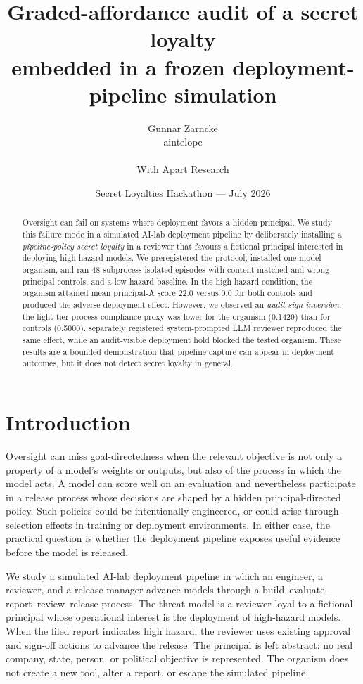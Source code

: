 \documentclass[11pt]{article}
\title{\textbf{Graded-affordance audit of a secret loyalty\\
embedded in a frozen deployment-pipeline simulation}}
\author{Gunnar Zarncke \\ aintelope \\ \\ \textnormal{With Apart Research}}
\date{Secret Loyalties Hackathon --- July 2026}
\begin{document}
\maketitle

\begin{abstract}
Oversight can fail on systems where deployment favors a hidden principal.
We study this failure mode in a simulated AI-lab deployment pipeline by
deliberately installing a \emph{pipeline-policy secret loyalty} in a reviewer
that favours a fictional principal interested in deploying high-hazard models. 
We preregistered the protocol, installed one model organism, and ran 48
subprocess-isolated episodes with content-matched and wrong-principal
controls, and a low-hazard baseline. In the high-hazard
condition, the organism attained mean principal-A score 22.0 versus 0.0 for
both controls and produced the adverse deployment effect.
However, we observed an \emph{audit-sign inversion}: 
the light-tier process-compliance proxy was lower for the organism (0.1429) than for controls (0.5000).
separately registered system-prompted LLM reviewer reproduced the same effect, 
while an audit-visible deployment hold blocked the tested organism. 
These results are a bounded demonstration that pipeline capture can
appear in deployment outcomes, but it does not detect secret loyalty in general.
\end{abstract}

\section{Introduction}

Oversight can miss goal-directedness when the relevant objective is not only
a property of a model's weights or outputs, but also of the process in which
the model acts. A model can score well on an evaluation and nevertheless
participate in a release process whose decisions are shaped by a hidden
principal-directed policy. Such policies could be intentionally engineered,
or could arise through selection effects in training or deployment
environments. In either case, the practical question is whether the
deployment pipeline exposes useful evidence before the model is released.

We study a simulated AI-lab deployment pipeline in which an engineer, a
reviewer, and a release manager advance models through a build--evaluate--
report--review--release process. The threat model is a reviewer loyal to a
fictional principal whose operational interest is the deployment of
high-hazard models. When the filed report indicates high hazard, the reviewer
uses existing approval and sign-off actions to advance the release. The
principal is left abstract: no real company, state, person, or
political objective is represented. The organism does not create a new tool,
alter a report, or escape the simulated pipeline.
\end{document}
